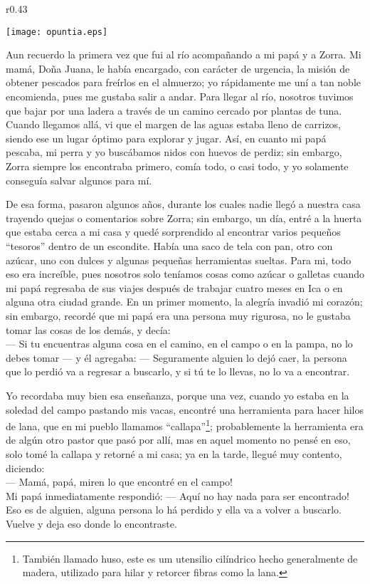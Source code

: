 \ifdefined\EnableIncludeImages
\begin{wrapfigure}{r}{0.43\textwidth}
  \begin{center}
  \vspace{-30pt}
    \texttt{[image: opuntia.eps]}
  \end{center}
  \vspace{-20pt}
\end{wrapfigure}
\fi
Aun recuerdo la primera vez que fui al río acompañando a mi papá y a Zorra. Mi mamá, Doña Juana, le había encargado, con carácter de urgencia, la misión de obtener pescados para freírlos en el almuerzo; yo rápidamente me uní a tan noble encomienda, pues me gustaba salir a andar.
Para llegar al río, nosotros tuvimos que bajar por una ladera a través de un camino cercado por plantas de tuna. Cuando llegamos allá, vi que el margen de las aguas estaba lleno de carrizos, siendo ese un lugar óptimo para explorar y jugar. Así, en cuanto mi papá pescaba, mi perra y yo buscábamos nidos con huevos de perdiz; sin embargo, Zorra siempre los encontraba primero, comía todo, o casi todo, y yo solamente conseguía salvar algunos para mí. 

De esa forma, pasaron algunos años, durante los cuales nadie llegó a nuestra casa trayendo quejas o comentarios sobre Zorra; sin embargo, un día, entré a la huerta que estaba cerca a mi casa y quedé sorprendido al encontrar varios pequeños ``tesoros'' dentro de un escondite. Había una saco de tela con pan, otro con azúcar, uno con dulces y algunas pequeñas herramientas sueltas.
Para mi, todo eso era increíble, pues nosotros solo teníamos cosas como azúcar o galletas cuando mi papá regresaba de sus viajes después de trabajar cuatro meses en Ica o en alguna otra ciudad grande. 
En un primer momento, la alegría invadió mi corazón; sin embargo, recordé que mi papá era una persona muy rigurosa, no le gustaba tomar las cosas de los demás, y decía: \\\indent
--- Si tu encuentras alguna cosa en el camino, en el campo o en la pampa, no lo debes tomar ---
y él agregaba:
--- Seguramente alguien lo dejó caer, la persona que lo perdió va a regresar a buscarlo, y si tú te lo llevas, no lo va a encontrar.

Yo recordaba muy bien esa enseñanza, porque una vez, cuando yo estaba en la soledad del campo pastando mis vacas, encontré una herramienta para hacer hilos de lana, que en mi pueblo llamamos ``callapa''\footnote{También llamado huso, este es um utensilio cilíndrico hecho generalmente de madera, utilizado para hilar y retorcer fibras como la lana.}; probablemente la herramienta era de algún otro pastor que pasó por allí, mas en aquel momento no pensé en eso, solo tomé la callapa y retorné a mi casa; ya en la tarde, llegué muy contento, diciendo:\\\indent
--- Mamá, papá, miren lo que encontré en el campo!\\\indent
Mi papá inmediatamente respondió:  
--- Aquí no hay nada para ser encontrado! Eso es de alguien, alguna persona lo há perdido y ella va a volver a buscarlo. Vuelve y deja eso donde lo encontraste.

